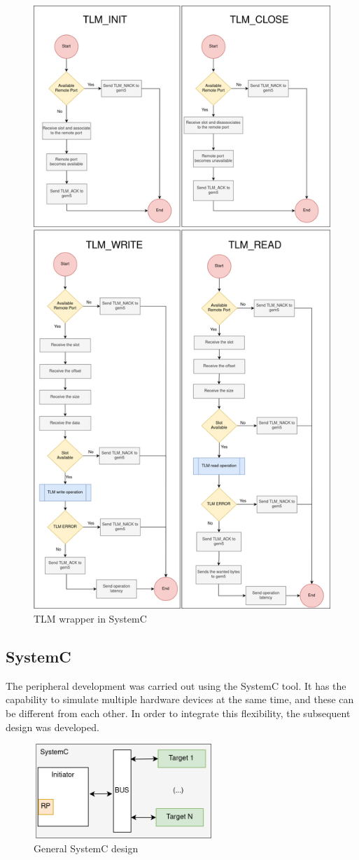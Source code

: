 \begin{figure}[H]
	\centering
 	\includegraphics[width=0.7\linewidth]{Images/TLMWrapper_SystemC.png} 
 	\caption{TLM wrapper in SystemC}
\end{figure}

\subsection{SystemC}

The peripheral development was carried out using the SystemC tool. It has the capability to simulate multiple hardware devices at the same time, 
and these can be different from each other. In order to integrate this flexibility, the subsequent design was developed.

\begin{figure}[H]
	\centering
	\includegraphics[width=0.6\textwidth]{Images/SystemCdesign.png}
	\caption{General SystemC design}
	\label{fig_SystemCdesign_geral}
\end{figure}


